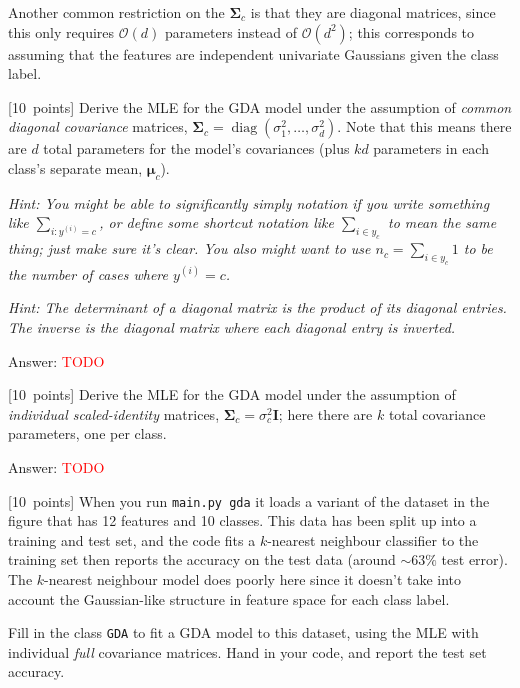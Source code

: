 \documentclass{article}
\newcommand{\ask}[1]{\textcolor{question}{#1}}
\newenvironment{answer}{\par\begingroup\color{answer}Answer: }{\endgroup}
\newcommand{\red}[1]{\textcolor{red}{#1}}
\newcommand{\pts}[1]{\textcolor{points}{[#1~points]}}
\newcommand{\hint}[1]{\textcolor{black!60!white}{\emph{Hint: #1}}}
\newcommand{\TODO}{\red{TODO}}
\newcommand{\bigO}{\mathcal{O}}
\newcommand{\bmu}{\bm{\mu}}
\newcommand{\bSigma}{\bm{\Sigma}}
\newcommand{\toth}[1]{^{(#1)}}
\newcommand{\ith}{\toth{i}}
\begin{document}
Another common restriction on the $\bSigma_c$ is that they are diagonal matrices,
since this only requires $\bigO(d)$ parameters instead of $\bigO(d^2)$;
this corresponds to assuming that the features are independent univariate Gaussians given the class label.

\begin{qlist}
\item \pts{10}
    \ask{Derive the MLE for the GDA model under the assumption of \emph{common diagonal covariance} matrices},
    $\bSigma_c = \operatorname{diag}(\sigma_1^2, \dots, \sigma_d^2)$.
    Note that this means there are $d$ total parameters for the model's covariances
    (plus $k d$ parameters in each class's separate mean, $\bmu_c$).

\hint{%
    You might be able to significantly simply notation if you write something like $\sum_{i : y\ith = c}$,
    or define some shortcut notation like $\sum_{i \in y_c}$ to mean the same thing;
    just make sure it's clear.
    You also might want to use $n_c = \sum_{i \in y_c} 1$ to be the number of cases where $y\ith = c$.
}

\hint{%
    The determinant of a diagonal matrix is the product of its diagonal entries.
    The inverse is the diagonal matrix where each diagonal entry is inverted.
}

\begin{answer}\TODO\end{answer}

\item \pts{10}
    \ask{Derive the MLE for the GDA model under the assumption of \emph{individual scaled-identity} matrices},
    $\bSigma_c = \sigma_c^2 \mathbf I$;
    here there are $k$ total covariance parameters, one per class.

\begin{answer}\TODO\end{answer}

\item \pts{10}
    When you run \texttt{main.py gda} it loads a variant of the dataset in the figure that has 12 features and 10 classes.
    This data has been split up into a training and test set, and the code fits a $k$-nearest neighbour classifier to the training set then reports the accuracy on the test data (around $\sim 63\%$ test error).
    The $k$-nearest neighbour model does poorly here since it doesn't take into account the Gaussian-like structure in feature space for each class label.

    Fill in the class \texttt{GDA} to fit a GDA model to this dataset, using the MLE with individual \emph{full} covariance matrices. 
    \ask{Hand in your code, and report the test set accuracy}.


\end{qlist}
\end{document}
